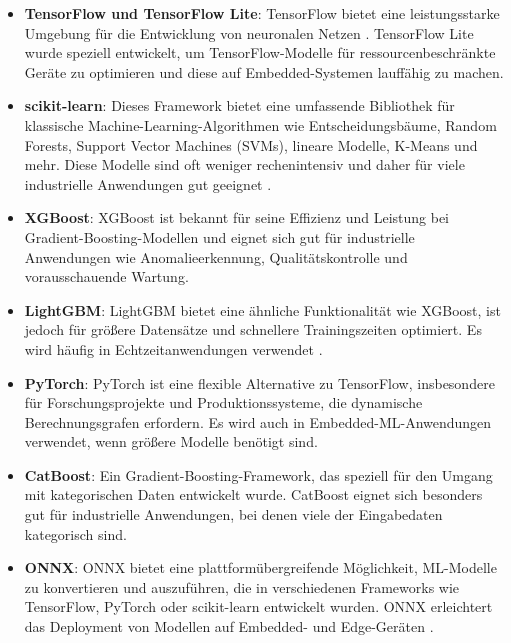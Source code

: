 \begin{itemize}
    \item \textbf{TensorFlow und TensorFlow Lite}: TensorFlow bietet eine leistungsstarke Umgebung für die Entwicklung von neuronalen Netzen \cite{8110869}. 
    TensorFlow Lite wurde speziell entwickelt, um TensorFlow-Modelle für ressourcenbeschränkte Geräte zu optimieren und diese auf Embedded-Systemen lauffähig zu machen\cite{9919465}.
    
    \item \textbf{scikit-learn}: Dieses Framework bietet eine umfassende Bibliothek für klassische Machine-Learning-Algorithmen wie 
    Entscheidungsbäume, Random Forests, Support Vector Machines (SVMs), lineare Modelle, K-Means und mehr. Diese Modelle sind oft weniger rechenintensiv 
    und daher für viele industrielle Anwendungen gut geeignet \cite{10306026}.

    \item \textbf{XGBoost}: XGBoost ist bekannt für seine Effizienz und Leistung bei Gradient-Boosting-Modellen und eignet sich gut für industrielle Anwendungen 
    wie Anomalieerkennung, Qualitätskontrolle und vorausschauende Wartung\cite{10603118}.

    \item \textbf{LightGBM}: LightGBM bietet eine ähnliche Funktionalität wie XGBoost, ist jedoch für größere Datensätze und schnellere Trainingszeiten optimiert. 
    Es wird häufig in Echtzeitanwendungen verwendet \cite{9123302}.

    \item \textbf{PyTorch}: PyTorch ist eine flexible Alternative zu TensorFlow, insbesondere für Forschungsprojekte und Produktionssysteme, 
    die dynamische Berechnungsgrafen erfordern. Es wird auch in Embedded-ML-Anwendungen verwendet, wenn größere Modelle benötigt sind\cite{9776868}.

    \item \textbf{CatBoost}: Ein Gradient-Boosting-Framework, das speziell für den Umgang mit kategorischen Daten entwickelt wurde. 
    CatBoost eignet sich besonders gut für industrielle Anwendungen, bei denen viele der Eingabedaten kategorisch sind\cite{10303419}.

    \item \textbf{ONNX}: ONNX bietet eine plattformübergreifende Möglichkeit, ML-Modelle zu konvertieren und auszuführen, die in verschiedenen Frameworks wie 
    TensorFlow, PyTorch oder scikit-learn entwickelt wurden. ONNX erleichtert das Deployment von Modellen auf Embedded- und Edge-Geräten \cite{9730351}.
\end{itemize}

